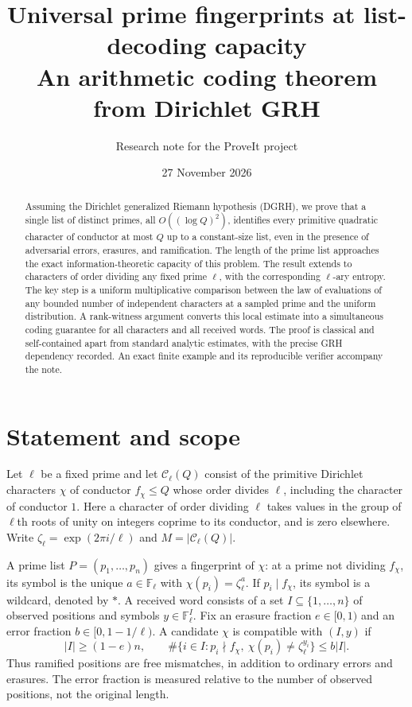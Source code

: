 \documentclass[11pt]{article}
\title{\bf Universal prime fingerprints at list-decoding capacity\\[4pt]\large An arithmetic coding theorem from Dirichlet GRH}
\author{Research note for the ProveIt project}
\date{27 November 2026}
\theoremstyle{remark}\newtheorem{remark}[theorem]{Remark}
\newcommand{\F}{\mathbb F}
\newcommand{\C}{\mathcal C}
\newcommand{\abs}[1]{\left|#1\right|}
\begin{document}
\maketitle
\begin{abstract}
Assuming the Dirichlet generalized Riemann hypothesis (DGRH), we prove that a single list of distinct primes, all $O((\log Q)^2)$, identifies every primitive quadratic character of conductor at most $Q$ up to a constant-size list, even in the presence of adversarial errors, erasures, and ramification. The length of the prime list approaches the exact information-theoretic capacity of this problem. The result extends to characters of order dividing any fixed prime $\ell$, with the corresponding $\ell$-ary entropy. The key step is a uniform multiplicative comparison between the law of evaluations of any bounded number of independent characters at a sampled prime and the uniform distribution. A rank-witness argument converts this local estimate into a simultaneous coding guarantee for all characters and all received words. The proof is classical and self-contained apart from standard analytic estimates, with the precise GRH dependency recorded. An exact finite example and its reproducible verifier accompany the note.
\end{abstract}

\section{Statement and scope}
Let $\ell$ be a fixed prime and let $\C_\ell(Q)$ consist of the primitive Dirichlet characters $\chi$ of conductor $f_\chi\le Q$ whose order divides $\ell$, including the character of conductor $1$. Here a character of order dividing $\ell$ takes values in the group of $\ell$th roots of unity on integers coprime to its conductor, and is zero elsewhere. Write $\zeta_\ell=\exp(2\pi i/\ell)$ and $M=\abs{\C_\ell(Q)}$.

A prime list $P=(p_1,\ldots,p_n)$ gives a fingerprint of $\chi$: at a prime not dividing $f_\chi$, its symbol is the unique $a\in\F_\ell$ with $\chi(p_i)=\zeta_\ell^a$. If $p_i\mid f_\chi$, its symbol is a wildcard, denoted by $*$. A received word consists of a set $I\subseteq\{1,\ldots,n\}$ of observed positions and symbols $y\in\F_\ell^I$. Fix an erasure fraction $e\in[0,1)$ and an error fraction $b\in[0,1-1/\ell)$. A candidate $\chi$ is compatible with $(I,y)$ if
\begin{equation}\label{eq:compatible}
\abs{I}\ge(1-e)n,\qquad
\#\{i\in I:p_i\nmid f_\chi,\ \chi(p_i)\ne\zeta_\ell^{y_i}\}\le b\abs{I}.
\end{equation}
Thus ramified positions are free mismatches, in addition to ordinary errors and erasures. The error fraction is measured relative to the number of observed positions, not the original length.
\end{document}
